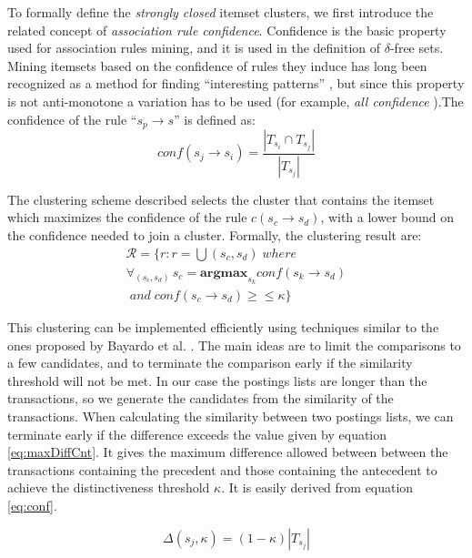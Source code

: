 \documentclass{sig-alternate}
\begin{document}
To formally define the \emph{strongly closed} itemset clusters, we first introduce the related concept of \emph{association rule confidence}. Confidence is the basic property used for association rules mining, and it is used in the definition of $\delta$-free sets. Mining itemsets based on the confidence of rules they induce has long been recognized as a method for finding ``interesting patterns'' \cite{cohen2001finding}, but since this property is not anti-monotone a variation has to be used (for example, \emph{all confidence} \cite{kim2004ccmine}).The confidence of the rule ``$s_{p} \rightarrow s$'' is  defined as:
\begin{equation}\label{eq:conf}conf(s_j \rightarrow s_i) = \frac{|T_{s_i} \cap T_{s_j}|}{|T_{s_j}|}\end{equation}

The clustering scheme described selects the cluster that contains the itemset which maximizes the confidence of the rule $c(s_c \rightarrow s_d)$, with a lower bound on the confidence needed to join a cluster. Formally, the clustering result are: 
\begin{multline}\label{eq:strongClosedFormal}
\mathcal{R} = \{r: r = \bigcup{(s_c, s_d)}\; where\; \\ \forall_{(s_c,s_d)} \, s_c = \textbf{argmax}_{s_k} conf(s_k \rightarrow s_d) \\\;and \;conf(s_c \rightarrow s_d) \ge\le \kappa\}
\end{multline}

This clustering can be implemented efficiently using techniques similar to the ones proposed by Bayardo et al. \cite{bayardo2007scaling}. The main ideas are to limit the comparisons to a few candidates, and to terminate the comparison early if the similarity threshold will not be met. In our case the postings lists are longer than the transactions, so we generate the candidates from the similarity of the transactions. When calculating the similarity between two postings lists, we can terminate early if the difference exceeds the value given by equation \ref{eq:maxDiffCnt}. It gives the maximum difference allowed between between the transactions containing the precedent and those containing the antecedent to achieve the distinctiveness threshold $\kappa$. It is easily derived from equation \ref{eq:conf}.

\begin{equation}\label{eq:maxDiffCnt}\Delta(s_j, \kappa) = (1 - \kappa)  |T_{s_j}|
\end{equation}
\end{document}
